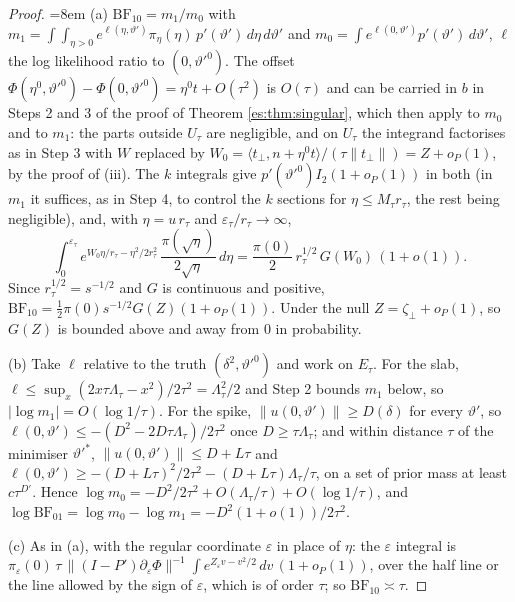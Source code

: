\begin{proof}
{\emergencystretch=8em (a) $\mathrm{BF}_{10}=m_1/m_0$ with $m_1=\int\!\!\int_{\eta>0}e^{\ell(\eta,\vartheta')}\pi_\eta(\eta)\,p'(\vartheta')\,d\eta\,d\vartheta'$ and $m_0=\int e^{\ell(0,\vartheta')}p'(\vartheta')\,d\vartheta'$, $\ell$ the log likelihood ratio to $(0,\vartheta'^0)$. The offset $\Phi(\eta^0,\vartheta'^0)-\Phi(0,\vartheta'^0)=\eta^0t+O(\tau^2)$ is $O(\tau)$ and can be carried in $b$ in Steps 2 and 3 of the proof of Theorem \ref{es:thm:singular}, which then apply to $m_0$ and to $m_1$: the parts outside $U_\tau$ are negligible, and on $U_\tau$ the integrand factorises as in Step 3 with $W$ replaced by $W_0=\langle t_\perp,n+\eta^0t\rangle/(\tau\|t_\perp\|)=Z+o_P(1)$, by the proof of (iii). The $k$ integrals give $p'(\vartheta'^0)I_2(1+o_P(1))$ in both (in $m_1$ it suffices, as in Step 4, to control the $k$ sections for $\eta\le M_\tau r_\tau$, the rest being negligible), and, with $\eta=u\,r_\tau$ and $\varepsilon_\tau/r_\tau\to\infty$,
\[
\int_0^{\varepsilon_\tau}e^{W_0\eta/r_\tau-\eta^2/2r_\tau^2}\,\frac{\pi(\sqrt\eta)}{2\sqrt\eta}\,d\eta=\frac{\pi(0)}2\,r_\tau^{1/2}\,G(W_0)\,(1+o(1)).
\]}
Since $r_\tau^{1/2}=s^{-1/2}$ and $G$ is continuous and positive, $\mathrm{BF}_{10}=\tfrac12\pi(0)s^{-1/2}G(Z)(1+o_P(1))$. Under the null $Z=\zeta_\perp+o_P(1)$, so $G(Z)$ is bounded above and away from $0$ in probability.

(b) Take $\ell$ relative to the truth $(\delta^2,\vartheta'^0)$ and work on $E_\tau$. For the slab, $\ell\le\sup_x(2x\tau\Lambda_\tau-x^2)/2\tau^2=\Lambda_\tau^2/2$ and Step 2 bounds $m_1$ below, so $|\log m_1|=O(\log1/\tau)$. For the spike, $\|u(0,\vartheta')\|\ge D(\delta)$ for every $\vartheta'$, so $\ell(0,\vartheta')\le-(D^2-2D\tau\Lambda_\tau)/2\tau^2$ once $D\ge\tau\Lambda_\tau$; and within distance $\tau$ of the minimiser $\vartheta'^*$, $\|u(0,\vartheta')\|\le D+L\tau$ and $\ell(0,\vartheta')\ge-(D+L\tau)^2/2\tau^2-(D+L\tau)\Lambda_\tau/\tau$, on a set of prior mass at least $c\tau^{D'}$. Hence $\log m_0=-D^2/2\tau^2+O(\Lambda_\tau/\tau)+O(\log1/\tau)$, and $\log\mathrm{BF}_{01}=\log m_0-\log m_1=-D^2(1+o(1))/2\tau^2$.

(c) As in (a), with the regular coordinate $\varepsilon$ in place of $\eta$: the $\varepsilon$ integral is $\pi_\varepsilon(0)\,\tau\,\|(I-P')\partial_\varepsilon\Phi\|^{-1}\int e^{Z_\varepsilon v-v^2/2}\,dv\,(1+o_P(1))$, over the half line or the line allowed by the sign of $\varepsilon$, which is of order $\tau$; so $\mathrm{BF}_{10}\asymp\tau$.
\end{proof}

